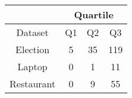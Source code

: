 \begin{tabular}{|c|c|c|c|}
\hline
 & \multicolumn{3}{c|}{Quartile} \\ 
\hline
Dataset &  Q1 &  Q2 &   Q3 \\
\hline
Election   &   5 &  35 &  119 \\
\hline
Laptop     &   0 &   1 &   11 \\
\hline
Restaurant &   0 &   9 &   55 \\
\hline
\end{tabular}